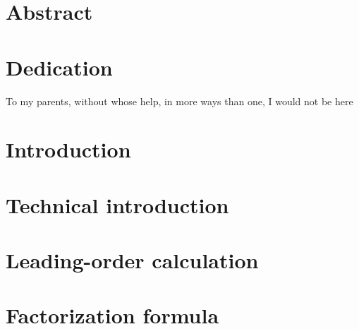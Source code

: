 \documentclass[12pt,twoside]{reedthesis}
\begin{document}
    \chapter*{Abstract}
	
	
	\chapter*{Dedication}
	To my parents, without whose help, in more ways than one, I would not be here

  \mainmatter %
  \pagestyle{fancyplain} %


\chapter{Introduction}\label{chap:intro}

	\graphicspath{{introduction/}}
	

	

\chapter{Technical introduction}\label{chap:technical}
	
	\graphicspath{{technical_introduction/}}
	


\chapter{Leading-order calculation}\label{chap:leading order}

	\graphicspath{{leading_order/}}
	


\chapter{Factorization formula}\label{chap:factorization}
\end{document}
